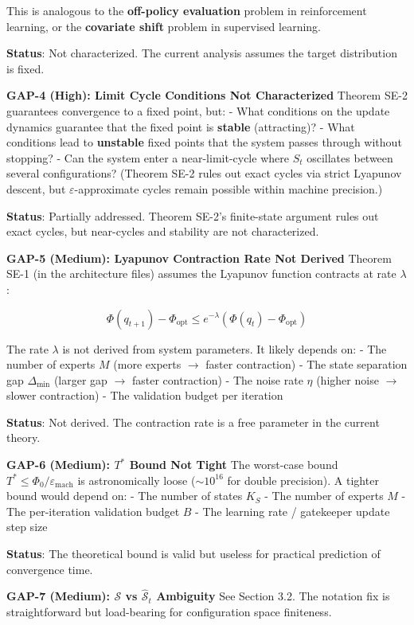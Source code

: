 \documentclass[
  12pt,
]{article}
\begin{document}
This is analogous to the \textbf{off-policy evaluation} problem in
reinforcement learning, or the \textbf{covariate shift} problem in
supervised learning.

\textbf{Status}: Not characterized. The current analysis assumes the
target distribution is fixed.

\textbf{GAP-4 (High): Limit Cycle Conditions Not Characterized} Theorem
SE-2 guarantees convergence to a fixed point, but: - What conditions on
the update dynamics guarantee that the fixed point is \textbf{stable}
(attracting)? - What conditions lead to \textbf{unstable} fixed points
that the system passes through without stopping? - Can the system enter
a near-limit-cycle where \(S_t\) oscillates between several
configurations? (Theorem SE-2 rules out exact cycles via strict Lyapunov
descent, but \(\varepsilon\)-approximate cycles remain possible within
machine precision.)

\textbf{Status}: Partially addressed. Theorem SE-2's finite-state
argument rules out exact cycles, but near-cycles and stability are not
characterized.

\textbf{GAP-5 (Medium): Lyapunov Contraction Rate Not Derived} Theorem
SE-1 (in the architecture files) assumes the Lyapunov function contracts
at rate \(\lambda\):

\[\Phi(q_{t+1}) - \Phi_{\text{opt}} \leq e^{-\lambda}(\Phi(q_t) - \Phi_{\text{opt}})\]

The rate \(\lambda\) is not derived from system parameters. It likely
depends on: - The number of experts \(M\) (more experts \(\to\) faster
contraction) - The state separation gap \(\Delta_{\min}\) (larger gap
\(\to\) faster contraction) - The noise rate \(\eta\) (higher noise
\(\to\) slower contraction) - The validation budget per iteration

\textbf{Status}: Not derived. The contraction rate is a free parameter
in the current theory.

\textbf{GAP-6 (Medium): \(T^*\) Bound Not Tight} The worst-case bound
\(T^* \leq \Phi_0/\varepsilon_{\text{mach}}\) is astronomically loose
(\(\sim 10^{16}\) for double precision). A tighter bound would depend
on: - The number of states \(K_S\) - The number of experts \(M\) - The
per-iteration validation budget \(B\) - The learning rate / gatekeeper
update step size

\textbf{Status}: The theoretical bound is valid but useless for
practical prediction of convergence time.

\textbf{GAP-7 (Medium): \(\mathcal{S}\) vs \(\hat{\mathcal{S}}_t\)
Ambiguity} See Section 3.2. The notation fix is straightforward but
load-bearing for configuration space finiteness.
\end{document}
